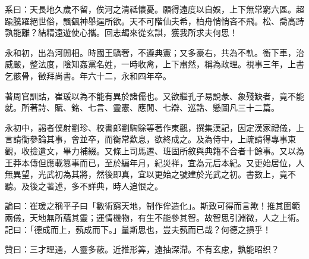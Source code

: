 \begin{pinyinscope}
系曰：天長地久歲不留，俟河之清祗懷憂。願得遠度以自娛，上下無常窮六區。超踰騰躍絕世俗，飄颻神舉逞所欲。天不可階仙夫希，柏舟悄悄吝不飛。松、喬高跱孰能離？結精遠遊使心攜。回志朅來從玄諆，獲我所求夫何思！

永和初，出為河閒相。時國王驕奢，不遵典憲；又多豪右，共為不軌。衡下車，治威嚴，整法度，陰知姦黨名姓，一時收禽，上下肅然，稱為政理。視事三年，上書乞骸骨，徵拜尚書。年六十二，永和四年卒。

著周官訓詁，崔瑗以為不能有異於諸儒也。又欲繼孔子易說彖、象殘缺者，竟不能就。所著詩、賦、銘、七言、靈憲、應閒、七辯、巡誥、懸圖凡三十二篇。

永初中，謁者僕射劉珍、校書郎劉騊駼等著作東觀，撰集漢記，因定漢家禮儀，上言請衡參論其事，會並卒，而衡常歎息，欲終成之。及為侍中，上疏請得專事東觀，收撿遺文，畢力補綴。又條上司馬遷、班固所敘與典籍不合者十餘事。又以為王莽本傳但應載篡事而已，至於編年月，紀災祥，宜為元后本紀。又更始居位，人無異望，光武初為其將，然後即真，宜以更始之號建於光武之初。書數上，竟不聽。及後之著述，多不詳典，時人追恨之。

論曰：崔瑗之稱平子曰「數術窮天地，制作侔造化」。斯致可得而言歟！推其圍範兩儀，天地無所蘊其靈；運情機物，有生不能參其智。故智思引淵微，人之上術。記曰：「德成而上，蓺成而下。」量斯思也，豈夫蓺而已哉？何德之損乎！

贊曰：三才理通，人靈多蔽。近推形筭，遠抽深滯。不有玄慮，孰能昭织？


\end{pinyinscope}